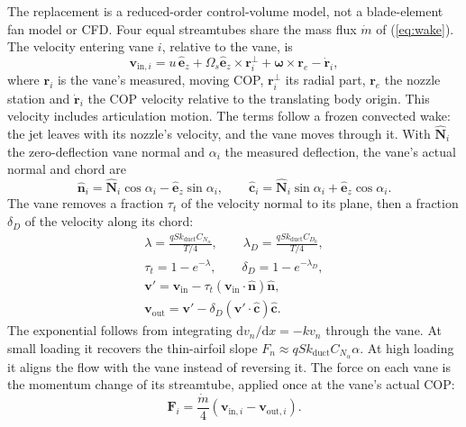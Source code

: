 \documentclass[journal]{IEEEtran}
\newcommand{\refeq}[1]{(\ref{#1})}
\newcommand{\vect}[1]{\bm{#1}}
\newcommand{\ez}{\hat{\vect{e}}_z}
\newcommand{\wb}{\vect{\omega}}
\newcommand{\mdot}{\dot{m}}
\begin{document}
The replacement is a reduced-order control-volume model, not a blade-element fan model or CFD.
Four equal streamtubes share the mass flux $\mdot$ of \refeq{eq:wake}.
The velocity entering vane $i$, relative to the vane, is
\begin{equation}
\vect{v}_{\text{in},i} = u\,\ez + \Omega_s\ez\times\vect{r}_i^{\perp} + \wb\times\vect{r}_e - \dot{\vect{r}}_i ,
\label{eq:inflow}
\end{equation}
where $\vect{r}_i$ is the vane's measured, moving COP, $\vect{r}_i^{\perp}$ its radial part, $\vect{r}_e$ the nozzle station and $\dot{\vect{r}}_i$ the COP velocity relative to the translating body origin.
This velocity includes articulation motion.
The terms follow a frozen convected wake: the jet leaves with its nozzle's velocity, and the vane moves through it.
With $\hat{\vect{N}}_i$ the zero-deflection vane normal and $\alpha_i$ the measured deflection, the vane's actual normal and chord are
\begin{equation}
\hat{\vect{n}}_i = \hat{\vect{N}}_i\cos\alpha_i - \ez\sin\alpha_i, \qquad
\hat{\vect{c}}_i = \hat{\vect{N}}_i\sin\alpha_i + \ez\cos\alpha_i .
\label{eq:basis}
\end{equation}
The vane removes a fraction $\tau_t$ of the velocity normal to its plane, then a fraction $\delta_D$ of the velocity along its chord:
\begin{gather}
\lambda = \frac{qSk_{\text{duct}}C_{N_\alpha}}{T/4}, \qquad
\lambda_D = \frac{qSk_{\text{duct}}C_{D_0}}{T/4}, \nonumber\\
\tau_t = 1 - e^{-\lambda}, \qquad \delta_D = 1 - e^{-\lambda_D}, \nonumber\\
\vect{v}' = \vect{v}_{\text{in}} - \tau_t(\vect{v}_{\text{in}}\cdot\hat{\vect{n}})\hat{\vect{n}}, \nonumber\\
\vect{v}_{\text{out}} = \vect{v}' - \delta_D(\vect{v}'\cdot\hat{\vect{c}})\hat{\vect{c}}.
\label{eq:turning}
\end{gather}
The exponential follows from integrating $\mathrm{d}v_n/\mathrm{d}x = -k v_n$ through the vane.
At small loading it recovers the thin-airfoil slope $F_n \approx qSk_{\text{duct}}C_{N_\alpha}\alpha$.
At high loading it aligns the flow with the vane instead of reversing it.
The force on each vane is the momentum change of its streamtube, applied once at the vane's actual COP:
\begin{equation}
\vect{F}_i = \frac{\mdot}{4}\left(\vect{v}_{\text{in},i} - \vect{v}_{\text{out},i}\right).
\label{eq:vaneforce}
\end{equation}
\end{document}
